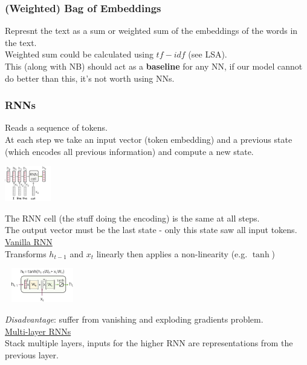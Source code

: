 \documentclass[8pt]{extarticle} %
\begin{document}
\begin{multicols*}{3}
\subsubsection*{(Weighted) Bag of Embeddings}
Represnt the text as a sum or weighted sum of the embeddings of the words in the text.\\
Weighted sum could be calculated using $tf-idf$ (see LSA).\\
This (along with NB) should act as a \textbf{baseline} for any NN, if our model cannot do better than this, it's not worth using NNs.

\subsubsection*{RNNs}
Reads a sequence of tokens.\\
At each step we take an input vector (token embedding) and a previous state (which encodes all previous information) and compute a new state. 
\begin{center}
\includegraphics*[width=0.15\textwidth]{media/rnn-cell.png}
\end{center}
The RNN cell (the stuff doing the encoding) is the same at all steps.\\
The output vector must be the last state - only this state saw all input tokens.\\  

\underline{Vanilla RNN}\\
Transforms $h_{t-1}$ and $x_t$ linearly then applies a non-linearity (e.g. $\tanh$) 
\begin{center}
\includegraphics*[width=0.25\textwidth]{media/vanilla-rnn.png}
\end{center}
\textit{Disadvantage}: suffer from vanishing and exploding gradients problem.\\

\underline{Multi-layer RNNs}\\
Stack multiple layers, inputs for the higher RNN are representations from the previous layer.\\


\end{multicols*}
\end{document}

